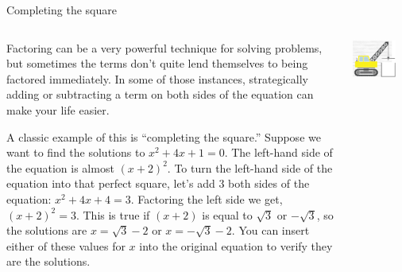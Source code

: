 \documentclass[9pt,aspectratio=169]{beamer}
\begin{document}
\begin{frame}{Completing the square}
  \begin{columns}[T]
    \begin{column}{0.5\textwidth}
      Factoring can be a very powerful technique for solving problems, but sometimes the terms don’t quite lend themselves to being factored immediately.  In some of those instances, strategically adding or subtracting a term on both sides of the equation can make your life easier.

      A classic example of this is “completing the square.”  Suppose we want to find the solutions to $x^2 + 4x + 1 = 0$.  The left-hand side of the equation is almost $(x+2)^2$.  To turn the left-hand side of the equation into that perfect square, let’s add $3$ both sides of the equation: $x^2 + 4x + 4 = 3$.  Factoring the left side we get, $(x+2)^2 = 3$. This is true if $(x+2)$ is equal to $\sqrt{3}$ or $-\sqrt{3}$, so the solutions are $x = \sqrt{3} - 2$ or $x = -\sqrt{3} - 2$.  You can insert either of these values for $x$ into the original equation to verify they are the solutions.

    \end{column}
    \begin{column}{0.5\textwidth}
      \begin{center}
        \includegraphics[width=0.8\textwidth]{18 - Quadratic Equations/tracktor.png}
      \end{center}
    \end{column}
  \end{columns}
\end{frame}
\end{document}
